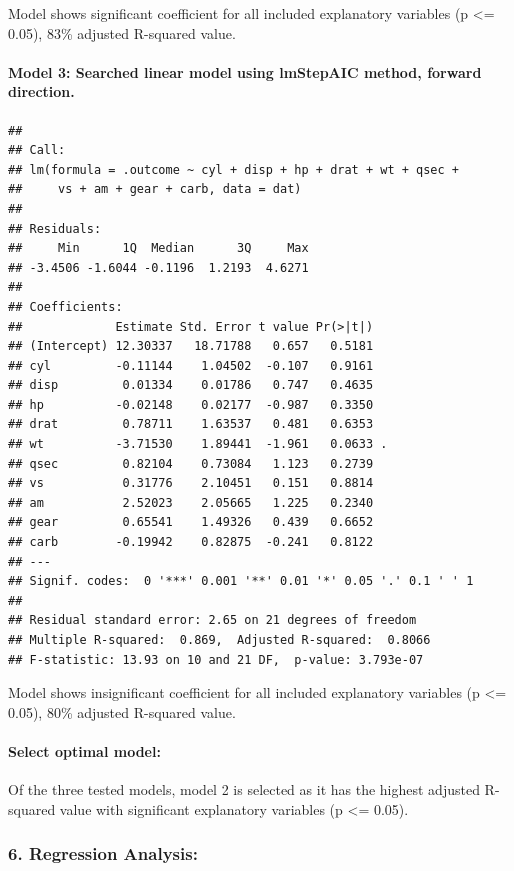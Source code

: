 \documentclass[]{article}
\begin{document}
Model shows significant coefficient for all included explanatory
variables (p \textless{}= 0.05), 83\% adjusted R-squared value.

\paragraph{Model 3: Searched linear model using lmStepAIC method,
forward
direction.}\label{model-3-searched-linear-model-using-lmstepaic-method-forward-direction.}

\begin{verbatim}
## 
## Call:
## lm(formula = .outcome ~ cyl + disp + hp + drat + wt + qsec + 
##     vs + am + gear + carb, data = dat)
## 
## Residuals:
##     Min      1Q  Median      3Q     Max 
## -3.4506 -1.6044 -0.1196  1.2193  4.6271 
## 
## Coefficients:
##             Estimate Std. Error t value Pr(>|t|)  
## (Intercept) 12.30337   18.71788   0.657   0.5181  
## cyl         -0.11144    1.04502  -0.107   0.9161  
## disp         0.01334    0.01786   0.747   0.4635  
## hp          -0.02148    0.02177  -0.987   0.3350  
## drat         0.78711    1.63537   0.481   0.6353  
## wt          -3.71530    1.89441  -1.961   0.0633 .
## qsec         0.82104    0.73084   1.123   0.2739  
## vs           0.31776    2.10451   0.151   0.8814  
## am           2.52023    2.05665   1.225   0.2340  
## gear         0.65541    1.49326   0.439   0.6652  
## carb        -0.19942    0.82875  -0.241   0.8122  
## ---
## Signif. codes:  0 '***' 0.001 '**' 0.01 '*' 0.05 '.' 0.1 ' ' 1
## 
## Residual standard error: 2.65 on 21 degrees of freedom
## Multiple R-squared:  0.869,  Adjusted R-squared:  0.8066 
## F-statistic: 13.93 on 10 and 21 DF,  p-value: 3.793e-07
\end{verbatim}

Model shows insignificant coefficient for all included explanatory
variables (p \textless{}= 0.05), 80\% adjusted R-squared value.

\paragraph{Select optimal model:}\label{select-optimal-model}

Of the three tested models, model 2 is selected as it has the highest
adjusted R-squared value with significant explanatory variables (p
\textless{}= 0.05).

\subsubsection{6. Regression Analysis:}\label{regression-analysis}
\end{document}
